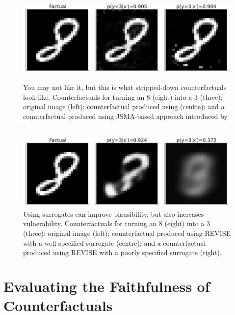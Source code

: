 \documentclass{article}
\begin{document}
\begin{figure}
  \centering
  \begin{minipage}[t]{0.45\textwidth}
    \centering
    \includegraphics[width=\textwidth]{../www/you_may_not_like_it.png}
    \caption{You may not like it, but this is what stripped-down counterfactuals look like. Counterfactuals for turning an 8 (eight) into a 3 (three): original image (left); counterfactual produced using \citet{wachter2017counterfactual} (centre); and a counterfactual produced using JSMA-based approach introduced by \citep{schut2021generating}.}\label{fig:adv}
  \end{minipage}\hfill
  \begin{minipage}[t]{0.45\textwidth}
    \centering
    \includegraphics[width=\textwidth]{../www/surrogate_gone_wrong.png}
    \caption{Using surrogates can improve plausibility, but also increases vulnerability. Counterfactuals for turning an 8 (eight) into a 3 (three): original image (left); counterfactual produced using REVISE \citep{joshi2019realistic} with a well-specified surrogate (centre); and a counterfactual produced using REVISE \citep{joshi2019realistic} with a poorly specified surrogate (right).}\label{fig:vae}
  \end{minipage}
\end{figure}

\section{Evaluating the Faithfulness of Counterfactuals}\label{conformity}
\end{document}
